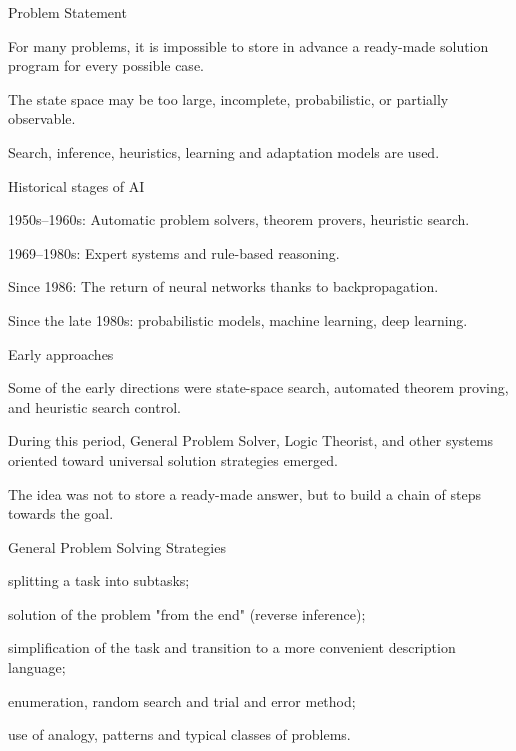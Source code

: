 \begin{frame}{Problem Statement}
	\topline
	\justifying
	
	\begin{textitemize}
		\item For many problems, it is impossible to store in advance a ready-made solution program for every possible case.
		\item The state space may be too large, incomplete, probabilistic, or partially observable.
		\item Search, inference, heuristics, learning and adaptation models are used.
	\end{textitemize}
\end{frame}

\begin{frame}{Historical stages of AI}
	\topline
	\justifying
	
	\begin{textitemize}
		\item 1950s–1960s: Automatic problem solvers, theorem provers, heuristic search.
		\item 1969–1980s: Expert systems and rule-based reasoning.
		\item Since 1986: The return of neural networks thanks to backpropagation.
		\item Since the late 1980s: probabilistic models, machine learning,  deep learning.
	\end{textitemize}
\end{frame}

\begin{frame}{Early approaches}
	\topline
	\justifying
	
	\begin{textitemize}
		\item Some of the early directions were state-space search, automated theorem proving, and heuristic search control.
		\item During this period, General Problem Solver, Logic Theorist, and other systems oriented toward universal solution strategies emerged.
		\item The idea was not to store a ready-made answer, but to build a chain of steps towards the goal.
	\end{textitemize}
\end{frame}

\begin{frame}{General Problem Solving Strategies}
	\topline
	\justifying
	
	\begin{textitemize}
		\item splitting a task into subtasks;
		\item solution of the problem "from the end"{} (reverse inference);
		\item simplification of the task and transition to a more convenient description language;
		\item enumeration, random search and trial and error method;
		\item use of analogy, patterns and typical classes of problems.
	\end{textitemize}
\end{frame}

